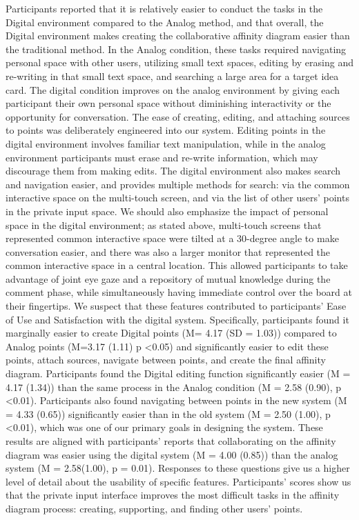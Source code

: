 \documentclass{sigchi}
\begin{document}
Participants reported that it is relatively easier to conduct the tasks in the Digital environment compared to the Analog method, and that overall, the Digital environment makes creating the collaborative affinity diagram easier than the traditional method. In the Analog condition, these tasks required navigating personal space with other users, utilizing small text spaces, editing by erasing and re-writing in that small text space, and searching a large area for a target idea card. The digital condition improves on the analog environment by giving each participant their own personal space without diminishing interactivity or the opportunity for conversation. The ease of creating, editing, and attaching sources to points was deliberately engineered into our system. Editing points in the digital environment involves familiar text manipulation, while in the analog environment participants must erase and re-write information, which may discourage them from making edits. The digital environment also makes search and navigation easier, and provides multiple methods for search: via the common interactive space on the multi-touch screen, and via the list of other users' points in the private input space. We should also emphasize the impact of personal space in the digital environment; as stated above, multi-touch screens that represented common interactive space were tilted at a 30-degree angle to make conversation easier, and there was also a larger monitor that represented the common interactive space in a central location. This allowed participants to take advantage of joint eye gaze and a repository of mutual knowledge during the comment phase, while simultaneously having immediate control over the board at their fingertips. We suspect that these features contributed to participants' Ease of Use and Satisfaction with the digital system. Specifically, participants found it marginally easier to create Digital points (M= 4.17 (SD = 1.03)) compared to Analog points (M=3.17 (1.11) p \textless 0.05) and significantly easier to edit these points, attach sources, navigate between points, and create the final affinity diagram.  Participants found the Digital editing function significantly easier (M = 4.17 (1.34)) than the same process in the Analog condition (M = 2.58 (0.90), p \textless 0.01). Participants also found navigating between points in the new system (M = 4.33 (0.65)) significantly easier than in the old system (M = 2.50 (1.00), p \textless 0.01), which was one of our primary goals in designing the system. These results are aligned with participants' reports that collaborating on the affinity diagram was easier using the digital system (M = 4.00 (0.85)) than the analog system (M = 2.58(1.00), p = 0.01). Responses to these questions give us a higher level of detail about the usability of specific features. Participants' scores show us that the private input interface improves the most difficult tasks in the affinity diagram process: creating, supporting, and finding other users' points. 
\end{document}

